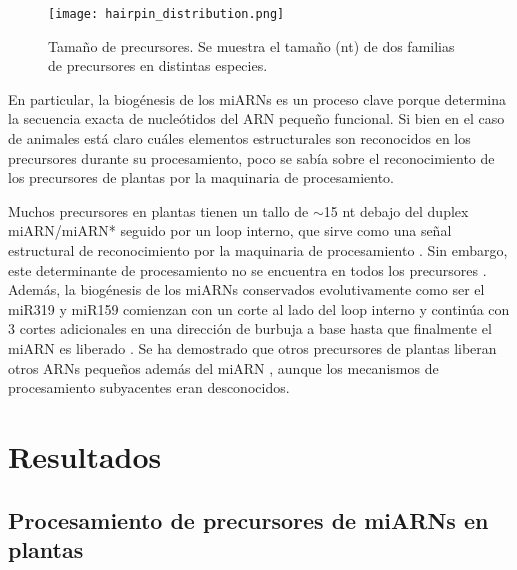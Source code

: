 \begin{figure}[htbp!] 
    \centering    
    \texttt{[image: hairpin\_distribution.png]}
    \caption[Tamaño de precursores]{Tamaño de precursores. Se muestra el tamaño (nt) de dos familias de precursores en distintas especies.}
    \label{fig:hairpin_distribution}
\end{figure}

En particular, la biogénesis de los miARNs es un proceso clave porque determina la secuencia exacta de nucleótidos del ARN pequeño funcional.
Si bien en el caso de animales está claro cuáles elementos estructurales son reconocidos en los precursores durante su procesamiento, poco se sabía sobre el reconocimiento de los precursores de plantas por la maquinaria de procesamiento.

Muchos precursores en plantas tienen un tallo de $\sim$15 nt debajo del duplex miARN/miARN* seguido por un loop interno, que sirve como una señal estructural de reconocimiento por la maquinaria de procesamiento \citep{pmid17369351,pmid16751099,Mateos2010,pmid20015654}.
Sin embargo, este determinante de procesamiento no se encuentra en todos los precursores \citep{Mateos2010}.
Además, la biogénesis de los miARNs conservados evolutivamente como ser el miR319 y miR159 comienzan con un corte al lado del loop interno y continúa con 3 cortes adicionales en una dirección de burbuja a base hasta que finalmente el miARN es liberado \citep{Bologna2013,pmid19850910}.
Se ha demostrado que otros precursores de plantas liberan otros ARNs pequeños además del miARN \citep{pmid15314213,pmid20696037}, aunque los mecanismos de procesamiento subyacentes eran desconocidos.

\section{Resultados} 


\subsection{Procesamiento de precursores de miARNs en plantas}
\label{sec:procesamiento}

